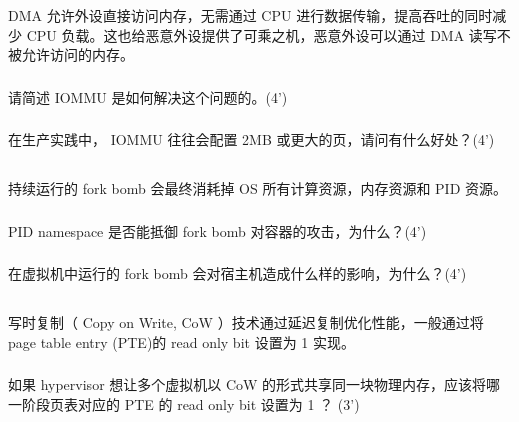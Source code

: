 \documentclass[a4paper,12pt]{article}
\newcommand{\score}[1]{(#1')}
\begin{document}
DMA 允许外设直接访问内存，无需通过 CPU 进行数据传输，提高吞吐的同时减少 CPU 负载。这也给恶意外设提供了可乘之机，恶意外设可以通过 DMA 读写不被允许访问的内存。

\subsubsection{}

请简述 IOMMU 是如何解决这个问题的。\score{4}

\subsubsection{}

在生产实践中， IOMMU 往往会配置 2MB 或更大的页，请问有什么好处？\score{4}

\subsection{}

持续运行的 fork bomb 会最终消耗掉 OS 所有计算资源，内存资源和 PID 资源。

\subsubsection{}

PID namespace 是否能抵御 fork bomb 对容器的攻击，为什么？\score{4}

\subsubsection{}

在虚拟机中运行的 fork bomb 会对宿主机造成什么样的影响，为什么？\score{4}

\subsection{}

写时复制（ Copy on Write, CoW ）技术通过延迟复制优化性能，一般通过将 page table entry (PTE)的 read only bit 设置为 1 实现。

\subsubsection{}

如果 hypervisor 想让多个虚拟机以 CoW 的形式共享同一块物理内存，应该将哪一阶段页表对应的 PTE 的 read only bit 设置为 1 ？ \score{3}


\subsubsection{}
\end{document}
